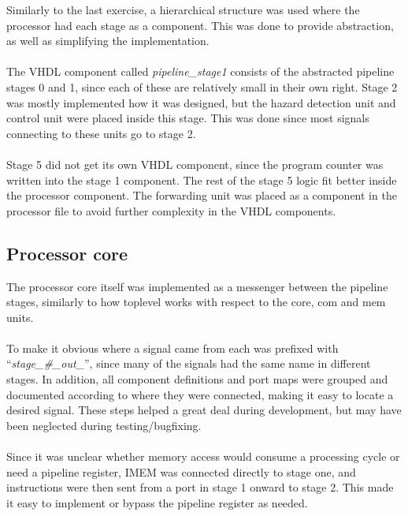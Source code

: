 Similarly to the last exercise, a hierarchical structure was used where the
processor had each stage as a component. This was done to provide abstraction,
as well as simplifying the implementation.
\paragraph*{}
The VHDL component called \emph{pipeline\_stage1} consists of the abstracted
pipeline stages 0 and 1, since each of these are relatively small in their own
right. Stage 2 was mostly implemented how it was designed, but the hazard
detection unit and control unit were placed inside this stage. This was done
since most signals connecting to these units go to stage 2.
\paragraph*{}
Stage 5 did not get its own VHDL component, since the program counter was
written into the stage 1 component. The rest of the stage 5 logic fit better
inside the processor component. The forwarding unit was placed as a component in the
processor file to avoid further complexity in the VHDL components.

\subsection{Processor core}
The processor core itself was implemented as a messenger between the pipeline
stages, similarly to how toplevel works with respect to the core, com and mem
units.
\paragraph*{}
To make it obvious where a signal came from each was prefixed with
``\emph{stage\_\#\_out\_}'', since many of the signals had the same name in
different stages. In addition, all component definitions and port maps were
grouped and documented according to where they were connected, making it easy to
locate a desired signal. These steps helped a great deal during development, but
may have been neglected during testing/bugfixing.
\paragraph*{}
Since it was unclear whether memory access would consume a processing cycle or
need a pipeline register, IMEM was connected directly to stage one, and
instructions were then sent from a port in stage 1 onward to stage 2. This made
it easy to implement or bypass the pipeline register as needed.

